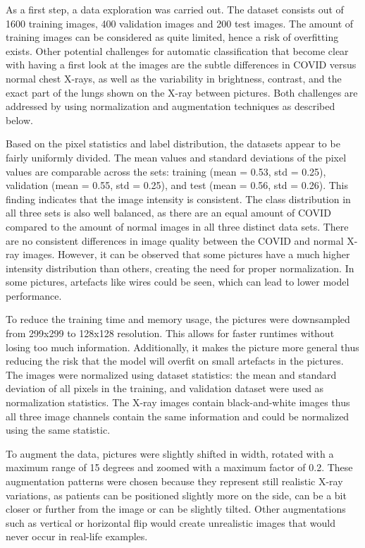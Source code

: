 \documentclass[conference]{IEEEtran}
\begin{document}
As a first step, a data exploration was carried out. The dataset consists out of 1600 training images, 400 validation images and 200 test images. The amount of training images can be considered as quite limited, hence a risk of overfitting exists. Other potential challenges for automatic classification that become clear with having a first look at the images are the subtle differences in COVID versus normal chest X-rays, as well as the variability in brightness, contrast, and the exact part of the lungs shown on the X-ray between pictures. Both challenges are addressed by using normalization and augmentation techniques as described below. 

Based on the pixel statistics and label distribution, the datasets appear to be fairly uniformly divided.  The mean values and standard deviations of the pixel values are comparable across the sets: training (mean = 0.53, std = 0.25), validation (mean = 0.55, std = 0.25), and test (mean = 0.56, std = 0.26). This finding indicates that the image intensity is consistent. The class distribution in all three sets is also well balanced, as there are an equal amount of COVID compared to the amount of normal images in all three distinct data sets. There are no consistent differences in image quality between the COVID and normal X-ray images. However, it can be observed that some pictures have a much higher intensity distribution than others, creating the need for proper normalization. In some pictures, artefacts like wires could be seen, which can lead to lower model performance. 

To reduce the training time and memory usage, the pictures were downsampled from 299x299 to 128x128 resolution. This allows for faster runtimes without losing too much information. Additionally, it makes the picture more general thus reducing the risk that the model will overfit on small artefacts in the pictures. The images were normalized using dataset statistics: the mean and standard deviation of all pixels in the training, and validation dataset were used as normalization statistics. The X-ray images contain black-and-white images thus all three image channels contain the same information and could be normalized using the same statistic. 

To augment the data, pictures were slightly shifted in width, rotated with a maximum range of 15 degrees and zoomed with a maximum factor of 0.2. These augmentation patterns were chosen because they represent still realistic X-ray variations, as patients can be positioned slightly more on the side, can be a bit closer or further from the image or can be slightly tilted. Other augmentations such as vertical or horizontal flip would create unrealistic images that would never occur in real-life examples.
\end{document}
